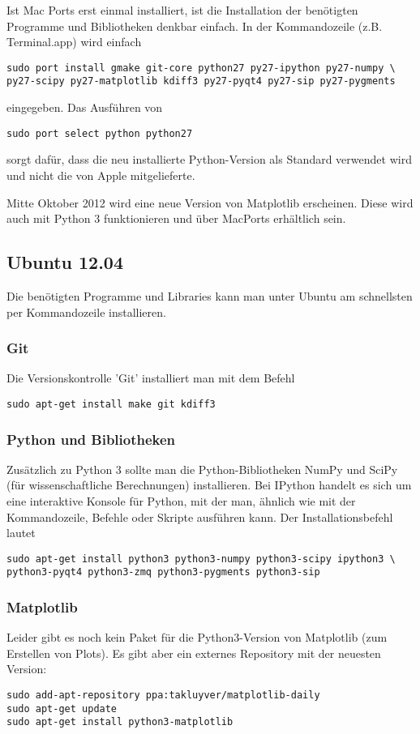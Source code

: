 Ist Mac Ports erst einmal installiert, ist die Installation der benötigten Programme und Bibliotheken denkbar einfach.
In der Kommandozeile (z.B. Terminal.app) wird einfach
\begin{verbatim}
sudo port install gmake git-core python27 py27-ipython py27-numpy \
py27-scipy py27-matplotlib kdiff3 py27-pyqt4 py27-sip py27-pygments
\end{verbatim}
eingegeben.
Das Ausführen von
\begin{verbatim}
sudo port select python python27
\end{verbatim}
sorgt dafür, dass die neu installierte Python-Version als Standard verwendet wird und nicht die von Apple mitgelieferte.

Mitte Oktober 2012 wird eine neue Version von Matplotlib erscheinen. Diese wird auch mit Python 3 funktionieren und über MacPorts erhältlich sein.

\subsection{Ubuntu 12.04}
Die benötigten Programme und Libraries kann man unter Ubuntu am schnellsten per Kommandozeile installieren.

\subsubsection{Git}
Die Versionskontrolle 'Git' installiert man mit dem Befehl
\begin{verbatim}
sudo apt-get install make git kdiff3
\end{verbatim}

\subsubsection{Python und Bibliotheken}
Zusätzlich zu Python 3 sollte man die Python-Bibliotheken NumPy und SciPy (für wissenschaftliche Berechnungen) installieren.
Bei IPython handelt es sich um eine interaktive Konsole für Python, mit der man, ähnlich wie mit der Kommandozeile, Befehle oder Skripte ausführen kann.
Der Installationsbefehl lautet
\begin{verbatim}
sudo apt-get install python3 python3-numpy python3-scipy ipython3 \
python3-pyqt4 python3-zmq python3-pygments python3-sip
\end{verbatim}

\subsubsection{Matplotlib}
Leider gibt es noch kein Paket für die Python3-Version von Matplotlib (zum Erstellen von Plots).
Es gibt aber ein externes Repository mit der neuesten Version:
\begin{verbatim}
sudo add-apt-repository ppa:takluyver/matplotlib-daily
sudo apt-get update
sudo apt-get install python3-matplotlib
\end{verbatim}

